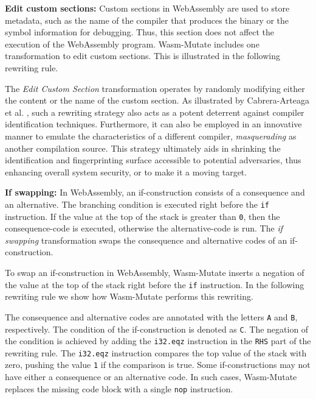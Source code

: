 \documentclass[a4paper,fleqn]{cas-dc}
\newcommand{\tool}{{\sc Wasm-Mutate}\xspace}
\begin{document}
\textbf{Edit custom sections:}
Custom sections in WebAssembly are used to store metadata, such as the name of the compiler that produces the binary or the symbol information for debugging.
Thus, this section does not affect the execution of the WebAssembly program.
\tool includes one transformation to edit custom sections. 
This is illustrated in the following rewriting rule. 



The \emph{Edit Custom Section} transformation operates by randomly modifying either the content or the name of the custom section. 
As illustrated by Cabrera-Arteaga et al. \cite{CABRERAARTEAGA2023103296}, such a rewriting strategy also acts as a potent deterrent against compiler identification techniques.
Furthermore, it can also be employed in an innovative manner to emulate the characteristics of a different compiler, \emph{masquerading} as another compilation source. 
This strategy ultimately aids in shrinking the identification and fingerprinting surface accessible to potential adversaries, thus enhancing overall system security, or to make it a moving target.



\textbf{If swapping:} In WebAssembly, an if-construction consists of a consequence and an alternative. The branching condition is executed right before the \texttt{if} instruction.
If the value at the top of the stack is greater than \texttt{0}, then the consequence-code is executed, otherwise the alternative-code is run.
The \emph{if swapping} transformation swaps the consequence and alternative codes of an if-construction.


To swap an if-construction in WebAssembly, \tool inserts a negation of the value at the top of the stack right before the \texttt{if} instruction.
In the following rewriting rule we show how \tool performs this rewriting.

The consequence and alternative codes are annotated with the letters \texttt{A} and \texttt{B}, respectively.
The condition of the if-construction is denoted as \texttt{C}.
The negation of the condition is achieved by adding the \texttt{i32.eqz} instruction in the \texttt{RHS} part of the rewriting rule.
The \texttt{i32.eqz} instruction compares the top value of the stack with zero, pushing the value \texttt{1} if the comparison is true.
Some if-constructions may not have either a consequence or an alternative code.
In such cases, \tool replaces the missing code block with a single \texttt{nop} instruction.
\end{document}
